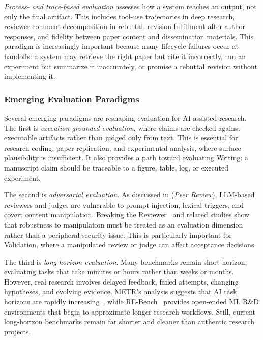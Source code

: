 \emph{Process- and trace-based evaluation} assesses how a system reaches an output, not only the final artifact. This includes tool-use trajectories in deep research, reviewer-comment decomposition in rebuttal, revision fulfillment after author responses, and fidelity between paper content and dissemination materials. This paradigm is increasingly important because many lifecycle failures occur at handoffs: a system may retrieve the right paper but cite it incorrectly, run an experiment but summarize it inaccurately, or promise a rebuttal revision without implementing it.


\subsubsection{Emerging Evaluation Paradigms}
\label{sec:eval_emerging}

Several emerging paradigms are reshaping evaluation for AI-assisted research. The first is \emph{execution-grounded evaluation}, where claims are checked against executable artifacts rather than judged only from text. This is essential for research coding, paper replication, and experimental analysis, where surface plausibility is insufficient. It also provides a path toward evaluating Writing: a manuscript claim should be traceable to a figure, table, log, or executed experiment.

The second is \emph{adversarial evaluation}. As discussed in \Ssix (\emph{Peer Review}), LLM-based reviewers and judges are vulnerable to prompt injection, lexical triggers, and covert content manipulation. Breaking the Reviewer~\cite{breakingreviewer2025} and related studies show that robustness to manipulation must be treated as an evaluation dimension rather than a peripheral security issue. This is particularly important for Validation, where a manipulated review or judge can affect acceptance decisions.

The third is \emph{long-horizon evaluation}. Many benchmarks remain short-horizon, evaluating tasks that take minutes or hours rather than weeks or months. However, real research involves delayed feedback, failed attempts, changing hypotheses, and evolving evidence. METR's analysis suggests that AI task horizons are rapidly increasing~\cite{metr2025forecasting}, while RE-Bench~\cite{rebench2024} provides open-ended ML R\&D environments that begin to approximate longer research workflows. Still, current long-horizon benchmarks remain far shorter and cleaner than authentic research projects.

